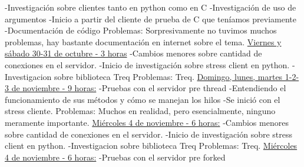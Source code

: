 \documentclass{report}
\begin{document}
{{{\newline
-Investigación sobre clientes tanto en python como en C\newline
-Investigación de uso de argumentos\newline
-Inicio a partir del cliente de prueba de C que teníamos previamente\newline
-Documentación de código
\newline
\newline
Problemas: Sorpresivamente no tuvimos muchos problemas, hay bastante documentación en internet sobre el tema.
\newline
\newline
{\underline {Viernes y sábado 30-31 de octubre - 3 horas}
\newline
-Cambios menores sobre cantidad de conexiones en el servidor.\newline
-Inicio de investigación sobre stress client en python.\newline
-Investigacion sobre biblioteca Treq\newline
\newline
\newline
Problemas: Treq.
\newline
\newline
{\underline {Domingo, lunes, martes 1-2-3 de noviembre - 9 horas:}
\newline
-Pruebas con el servidor pre thread\newline
-Entendiendo el funcionamiento de sus métodos y cómo se manejan los hilos\newline
-Se inició con el stress cliente.
\newline
\newline
Problemas: Muchos en realidad, pero esencialmente, ninguno meramente importante.
\newline
\newline
{\underline {Miércoles 4 de noviembre - 6 horas:}
\newline
-Cambios menores sobre cantidad de conexiones en el servidor.\newline
-Inicio de investigación sobre stress client en python.\newline
-Investigacion sobre biblioteca Treq
\newline
\newline
Problemas: Treq.
\newline
\newline
{\underline {Miércoles 4 de noviembre - 6 horas:}
\newline
-Pruebas con el servidor pre forked\newline
}}}}}}}
\end{document}
